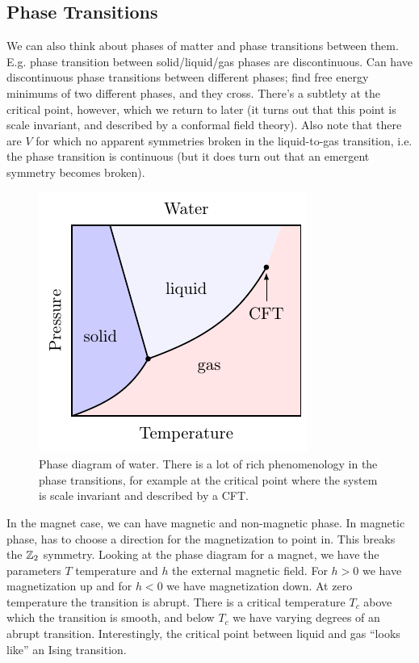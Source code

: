 \subsection{Phase Transitions}

We can also think about phases of matter and phase transitions between them. E.g. phase transition between solid/liquid/gas phases are discontinuous. Can have discontinuous phase transitions between different phases; find free energy minimums of two different phases, and they cross. There's a subtlety at the critical point, however, which we return to later (it turns out that this point is scale invariant, and described by a conformal field theory). Also note that there are $V$ for which no apparent symmetries broken in the liquid-to-gas transition, i.e. the phase transition is continuous (but it does turn out that an emergent symmetry becomes broken).

\begin{figure}[htbp!]
    \centering
    \includegraphics[]{Lectures/Figures/PT_diagram.pdf}
    \caption{Phase diagram of water. There is a lot of rich phenomenology in the phase transitions, for example at the critical point where the system is scale invariant and described by a CFT.}
    \label{fig:PTwater}
\end{figure}

In the magnet case, we can have magnetic and non-magnetic phase. In magnetic phase, has to choose a direction for the magnetization to point in. This breaks the $\mathbb{Z}_2$ symmetry. Looking at the phase diagram for a magnet, we have the parameters $T$ temperature and $h$ the external magnetic field. For $h > 0$ we have magnetization up and for $h < 0$ we have magnetization down. At zero temperature the transition is abrupt. There is a critical temperature $T_c$ above which the transition is smooth, and below $T_c$ we have varying degrees of an abrupt transition. Interestingly, the critical point between liquid and gas ``looks like'' an Ising transition.

